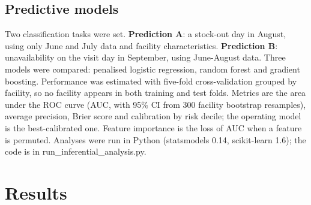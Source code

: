\documentclass[10pt,a4paper]{article}
\begin{document}
\subsection{Predictive models}
Two classification tasks were set. \textbf{Prediction A}: a stock-out day in August, using only June and July data and facility characteristics. \textbf{Prediction B}: unavailability on the visit day in September, using June-August data. Three models were compared: penalised logistic regression, random forest and gradient boosting. Performance was estimated with five-fold cross-validation grouped by facility, so no facility appears in both training and test folds. Metrics are the area under the ROC curve (AUC, with 95\% CI from 300 facility bootstrap resamples), average precision, Brier score and calibration by risk decile; the operating model is the best-calibrated one. Feature importance is the loss of AUC when a feature is permuted. Analyses were run in Python (statsmodels 0.14, scikit-learn 1.6); the code is in run\_inferential\_analysis.py.

\section{Results}
\end{document}
